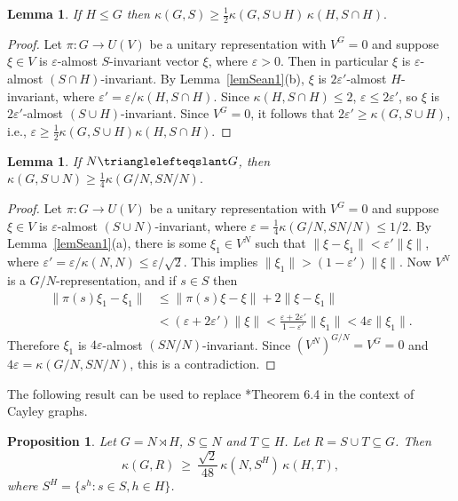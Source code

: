 \documentclass[11pt]{amsart}
\numberwithin{equation}{section}
\newtheorem{lemma}[theorem]{Lemma}
\newtheorem{proposition}[theorem]{Proposition}
\theoremstyle{remark}
\newcommand\eps{\varepsilon}
\def\kaz{\kappa}
\def\sgp{\leqslant}
\def\nsgp{\trianglelefteqslant}
\begin{document}
\begin{lemma} \label{lemSean2}
    If $H \sgp G$ then
    \(
        \kaz(G, S) \ge \frac12 \kaz(G, S \cup H) \, \kaz(H, S \cap H).
    \)
\end{lemma}
\begin{proof}
    Let $\pi \colon G \to U(V)$ be a unitary representation with $V^G = 0$ and suppose $\xi \in V$ is $\eps$-almost $S$-invariant vector $\xi$, where $\eps > 0$.
    Then in particular $\xi$ is $\eps$-almost $(S \cap H)$-invariant.
    By Lemma~\ref{lemSean1}(b), $\xi$ is $2\eps'$-almost $H$-invariant, where $\eps' = \eps / \kaz(H, S \cap H)$.
    Since $\kaz(H, S \cap H) \le 2$, $\eps \le 2\eps'$, so $\xi$ is $2\eps'$-almost $(S \cup H)$-invariant.
    Since $V^G = 0$, it follows that $2\eps' \ge \kaz(G, S \cup H)$, i.e., $\eps \ge \frac12 \kaz(G, S \cup H) \kaz(H, S \cap H)$.
\end{proof}

\begin{lemma} \label{lemSean3}
    If $N \nsgp G$, then
    \(
        \kaz(G, S \cup N) \ge \frac14 \kaz(G/N, SN/N).
    \)
\end{lemma}
\begin{proof}
    Let $\pi \colon G \to U(V)$ be a unitary representation with $V^G = 0$ and suppose $\xi \in V$ is $\eps$-almost $(S \cup N)$-invariant,
    where $\eps = \frac14 \kaz(G/N, SN/N) \le 1/2$.
    By Lemma~\ref{lemSean1}(a), there is some $\xi_1 \in V^N$ such that $\|\xi - \xi_1\| < \eps' \|\xi\|$, where $\eps' = \eps / \kaz(N, N) \le \eps / \sqrt 2$.
    This implies $\|\xi_1\| > (1 - \eps') \|\xi\|$.
    Now $V^N$ is a $G/N$-representation, and if $s \in S$ then
     \begin{align*}
        \|\pi(s) \xi_1 - \xi_1\|
        &\le \|\pi(s) \xi - \xi\| + 2 \|\xi - \xi_1\|  \\
        &<  (\eps + 2\eps') \|\xi\|
        <  \frac{\eps + 2\eps'}{1 - \eps'} \|\xi_1\|
        <  4\eps \|\xi_1\| .
    \end{align*}
    Therefore $\xi_1$ is $4\eps$-almost $(SN/N)$-invariant.
    Since $(V^N)^{G/N} = V^G = 0$ and $4 \eps = \kaz(G/N, SN/N)$, this is a contradiction.
\end{proof}

The following result can be used to replace \cite{RVW02}*{Theorem 6.4} in the
context of Cayley graphs.

\begin{proposition}\label{prop:semidirect}
    Let $G = N \rtimes H$, $S \subseteq N$ and $T \subseteq H$.
    Let $R = S \cup T \subseteq G$.
    Then
    \[
    \kaz(G, R)
    \> \ge \>
    \frac{\sqrt 2}{48} \, \kaz(N , S^H) \, \kaz(H , T),
    \]
    where $S^H = \{s^h : s \in S, h \in H\}$.
\end{proposition}
\end{document}
